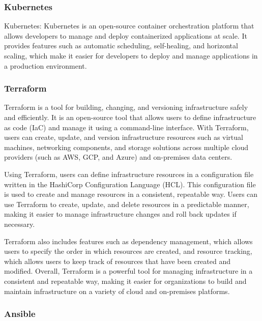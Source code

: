 \documentclass[
  10pt,
  paper=a4,
  ,captions=tableheading
]{scrartcl}
\begin{document}
\hypertarget{kubernetes}{%
\subsubsection{Kubernetes}\label{kubernetes}}

Kubernetes: Kubernetes is an open-source container orchestration
platform that allows developers to manage and deploy containerized
applications at scale. It provides features such as automatic
scheduling, self-healing, and horizontal scaling, which make it easier
for developers to deploy and manage applications in a production
environment.

\hypertarget{terraform}{%
\subsubsection{Terraform}\label{terraform}}

Terraform is a tool for building, changing, and versioning
infrastructure safely and efficiently. It is an open-source tool that
allows users to define infrastructure as code (IaC) and manage it using
a command-line interface. With Terraform, users can create, update, and
version infrastructure resources such as virtual machines, networking
components, and storage solutions across multiple cloud providers (such
as AWS, GCP, and Azure) and on-premises data centers.

Using Terraform, users can define infrastructure resources in a
configuration file written in the HashiCorp Configuration Language
(HCL). This configuration file is used to create and manage resources in
a consistent, repeatable way. Users can use Terraform to create, update,
and delete resources in a predictable manner, making it easier to manage
infrastructure changes and roll back updates if necessary.

Terraform also includes features such as dependency management, which
allows users to specify the order in which resources are created, and
resource tracking, which allows users to keep track of resources that
have been created and modified. Overall, Terraform is a powerful tool
for managing infrastructure in a consistent and repeatable way, making
it easier for organizations to build and maintain infrastructure on a
variety of cloud and on-premises platforms.

\hypertarget{ansible}{%
\subsubsection{Ansible}\label{ansible}}
\end{document}
